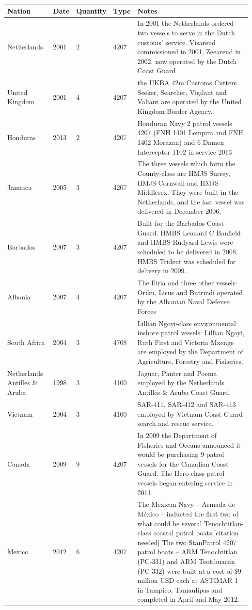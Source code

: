 \documentclass{article}
\begin{document}
\begin{tabular}{lllll}
\toprule
Nation & Date & Quantity & Type & Notes \\
\midrule
Netherlands & 2001 & 2 & 4207 & In 2001 the Netherlands ordered two vessels to serve in the Dutch customs' service. Visarend commissioned in 2001, Zeearend in 2002. now operated by the Dutch Coast Guard \\
United Kingdom & 2001 & 4 & 4207 & the UKBA 42m Customs Cutters Seeker, Searcher, Vigilant and Valiant are operated by the United Kingdom Border Agency. \\
Honduras & 2013 & 2 & 4207 & Honduran Navy 2 patrol vessels 4207 (FNH 1401 Lempira and FNH 1402 Morazan) and 6 Damen Interceptor 1102 in service 2013 \\
Jamaica & 2005 & 3 & 4207 & The three vessels which form the County-class are HMJS Surrey, HMJS Cornwall and HMJS Middlesex. They were built in the Netherlands, and the last vessel was delivered in December 2006. \\
Barbados & 2007 & 3 & 4207 & Built for the Barbados Coast Guard. HMBS Leonard C Banfield and HMBS Rudyard Lewis were scheduled to be delivered in 2008. HMBS Trident was scheduled for delivery in 2009. \\
Albania & 2007 & 4 & 4207 & The Iliria and three other vessels: Oriku, Lisus and Butrindi operated by the Albanian Naval Defense Forces \\
South Africa & 2004 & 3 & 4708 & Lillian Ngoyi-class environmental inshore patrol vessels: Lillian Ngoyi, Ruth First and Victoria Mxenge are employed by the Department of Agriculture, Forestry and Fisheries. \\
Netherlands Antilles \& Aruba & 1998 & 3 & 4100 & Jaguar, Panter and Poema employed by the Netherlands Antilles \& Aruba Coast Guard. \\
Vietnam & 2004 & 3 & 4100 & SAR-411, SAR-412 and SAR-413 employed by Vietnam Coast Guard search and rescue service. \\
Canada & 2009 & 9 & 4207 & In 2009 the Department of Fisheries and Oceans announced it would be purchasing 9 patrol vessels for the Canadian Coast Guard. The Hero-class patrol vessels began entering service in 2011. \\
Mexico & 2012 & 6 & 4207 & The Mexican Navy – Armada de México – inducted the first two of what could be several Tenochtitlan-class coastal patrol boats.[citation needed] The two StanPatrol 4207 patrol boats – ARM Tenochtitlan (PC-331) and ARM Teotihuacan (PC-332) were built at a cost of \$9 million USD each at ASTIMAR 1 in Tampico, Tamaulipas and completed in April and May 2012. \\

\end{tabular}
\end{document}
